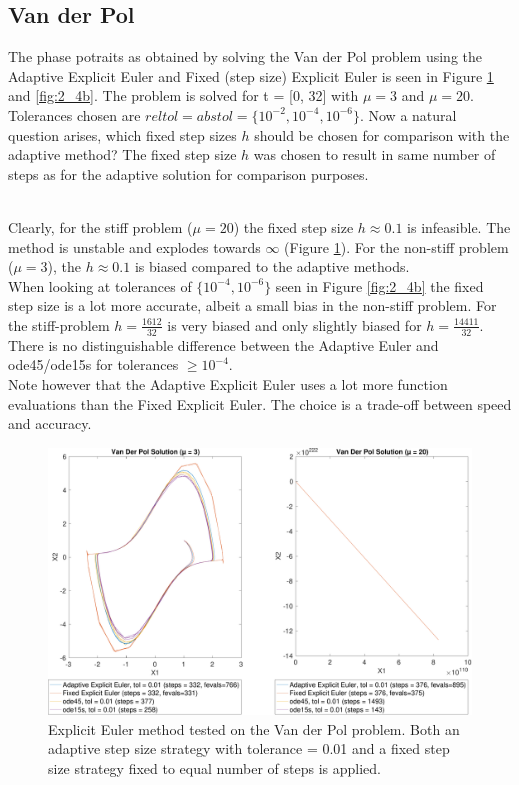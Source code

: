 \subsection{Van der Pol}
The phase potraits as obtained by solving the Van der Pol problem using the Adaptive Explicit Euler and Fixed (step size) Explicit Euler is seen in Figure \ref{fig:2_4a} and \ref{fig:2_4b}. The problem is solved for t = [0, 32] with $\mu = 3$ and $\mu =20$. Tolerances chosen are $reltol = abstol = \{10^{-2}, 10^{-4}, 10^{-6}\}$. Now a natural question arises, which fixed step sizes $h$ should be chosen for comparison with the adaptive method? The fixed step size $h$ was chosen to result in same number of steps as for the adaptive solution for comparison purposes.

\\
Clearly, for the stiff problem ($\mu = 20$) the fixed step size $h \approx 0.1$ is infeasible. The method is unstable and explodes towards $\infty$ (Figure \ref{fig:2_4a}). For the non-stiff problem ($\mu = 3$), the $h \approx 0.1$ is biased compared to the adaptive methods.
\\

When looking at tolerances of $\{10^{-4}, 10^{-6}\}$ seen in Figure \ref{fig:2_4b} the fixed step size is a lot more accurate, albeit a small bias in the non-stiff problem. For the stiff-problem $h=\frac{1612}{32}$ is very biased and only slightly biased for $h=\frac{14411}{32}$. There is no distinguishable difference between the Adaptive Euler and ode45/ode15s for tolerances $\geq 10^{-4}$.
\\

Note however that the Adaptive Explicit Euler uses a lot more function evaluations than the Fixed Explicit Euler. The choice is a trade-off between speed and accuracy.

\begin{figure}
    \centering
    \includegraphics[width=\textwidth]{plots/2_4main_02.pdf}
    \caption{Explicit Euler method tested on the Van der Pol problem. Both an adaptive step size strategy with tolerance = 0.01 and a fixed step size strategy fixed to equal number of steps is applied.}
    \label{fig:2_4a}
\end{figure}

